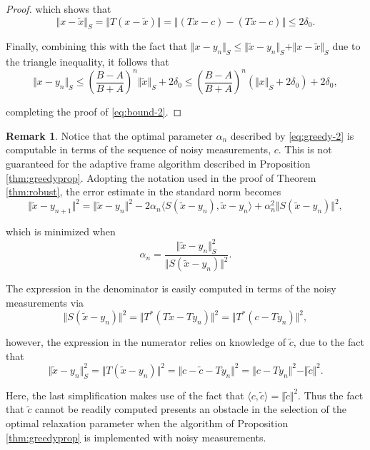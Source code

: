 \documentclass[11pt]{amsart}
\newcounter{Theorem}
\numberwithin{Theorem}{section}
\theoremstyle{definition}
\newtheorem*{remark*}{Remark}
\begin{document}
\begin{proof}
\noindent
which shows that 
$$ \Vert x-\tilde{x}\Vert_{S} = \Vert T(x-\tilde{x})\Vert = \Vert (Tx-c)-(T\tilde{x}-c)\Vert \le 2\delta_{0}. $$ 

\noindent
Finally, combining this with the fact that $\Vert x-y_{n} \Vert_{S} \le \Vert \tilde{x}-y_{n}\Vert_{S} + \Vert x-\tilde{x}\Vert_{S}$ due to the triangle inequality, it follows that
$$ \Vert x-y_{n}\Vert_{S} \le \left ( \frac{B-A}{B+A} \right )^{n} \Vert \tilde{x} \Vert_{S} + 2 \delta_{0} \le \left ( \frac{B-A}{B+A} \right )^{n} \left ( \Vert x \Vert_{S} + 2\delta_{0} \right ) + 2 \delta_{0}, $$

\noindent
completing the proof of \eqref{eq:bound-2}.
\end{proof}

\begin{remark*}
Notice that the optimal parameter $\alpha_{n}$ described by \eqref{eq:greedy-2} is computable in terms of the sequence of noisy measurements, $c$.  This is not guaranteed for the adaptive frame algorithm described in Proposition \ref{thm:greedyprop}.  Adopting the notation used in the proof of Theorem \ref{thm:robust}, the error estimate in the standard norm becomes
$$ \Vert \tilde{x}-y_{n+1} \Vert^{2} = \Vert \tilde{x}-y_{n} \Vert^{2} - 2\alpha_{n} \langle S(\tilde{x}-y_{n}),\tilde{x}-y_{n}\rangle + \alpha_{n}^{2} \Vert S(\tilde{x}-y_{n}) \Vert^{2}, $$

\noindent
which is minimized when 
$$ \alpha_{n} = \frac{\Vert \tilde{x}-y_{n}\Vert_{S}^{2}}{\Vert S(\tilde{x}-y_{n})\Vert^{2}}. $$


\noindent
The expression in the denominator is easily computed in terms of the noisy measurements via
$$ \Vert S(\tilde{x}-y_{n})\Vert^{2} = \Vert T^{*}(T\tilde{x}-Ty_{n})\Vert^{2} = \Vert T^{*}(c-Ty_{n})\Vert^{2}, $$

\noindent
however, the expression in the numerator relies on knowledge of $\tilde{c}$, due to the fact that
$$ \Vert \tilde{x}-y_{n}\Vert_{S}^{2} = \Vert T(\tilde{x}-y_{n}) \Vert^{2} = \Vert c-\tilde{c}-Ty_{n}\Vert^{2} = \Vert c-Ty_{n}\Vert^{2} - \Vert \tilde{c} \Vert^{2}. $$

\noindent
Here, the last simplification makes use of the fact that $\langle c,\tilde{c}\rangle = \Vert \tilde{c}\Vert^{2}$.  Thus the fact that $\tilde{c}$ cannot be readily computed presents an obstacle in the selection of the optimal relaxation parameter when the algorithm of Proposition \ref{thm:greedyprop} is implemented with noisy measurements.
\end{remark*}
\end{document}
